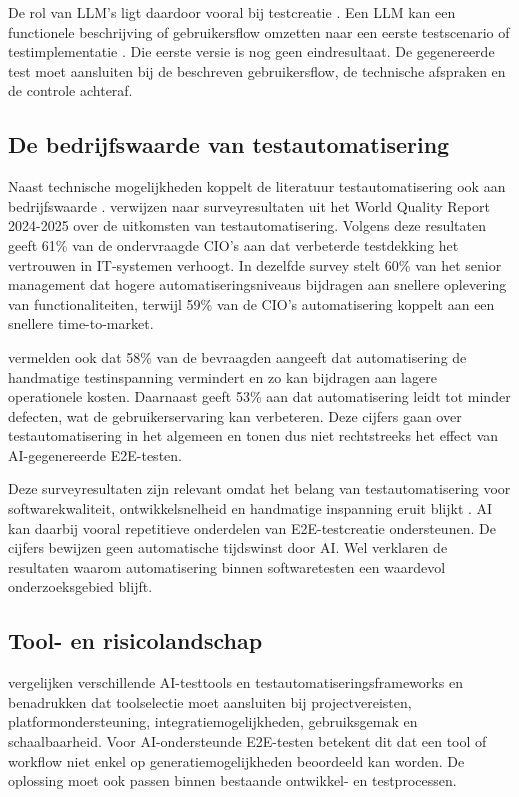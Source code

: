 De rol van LLM's ligt daardoor vooral bij testcreatie \autocite{SaezIznaga2025}. Een LLM kan een functionele beschrijving of gebruikersflow omzetten naar een eerste testscenario of testimplementatie \autocite{SaezIznaga2025}. Die eerste versie is nog geen eindresultaat. De gegenereerde test moet aansluiten bij de beschreven gebruikersflow, de technische afspraken en de controle achteraf.

\subsection{De bedrijfswaarde van testautomatisering}

Naast technische mogelijkheden koppelt de literatuur testautomatisering ook aan bedrijfswaarde \autocite{Raju2025}. \textcite{Raju2025} verwijzen naar surveyresultaten uit het World Quality Report 2024-2025 over de uitkomsten van testautomatisering. Volgens deze resultaten geeft 61\% van de ondervraagde CIO's aan dat verbeterde testdekking het vertrouwen in IT-systemen verhoogt. In dezelfde survey stelt 60\% van het senior management dat hogere automatiseringsniveaus bijdragen aan snellere oplevering van functionaliteiten, terwijl 59\% van de CIO's automatisering koppelt aan een snellere time-to-market.

\textcite{Raju2025} vermelden ook dat 58\% van de bevraagden aangeeft dat automatisering de handmatige testinspanning vermindert en zo kan bijdragen aan lagere operationele kosten. Daarnaast geeft 53\% aan dat automatisering leidt tot minder defecten, wat de gebruikerservaring kan verbeteren. Deze cijfers gaan over testautomatisering in het algemeen en tonen dus niet rechtstreeks het effect van AI-gegenereerde E2E-testen.

Deze surveyresultaten zijn relevant omdat het belang van testautomatisering voor softwarekwaliteit, ontwikkelsnelheid en handmatige inspanning eruit blijkt \autocite{Raju2025}. AI kan daarbij vooral repetitieve onderdelen van E2E-testcreatie ondersteunen. De cijfers bewijzen geen automatische tijdswinst door AI. Wel verklaren de resultaten waarom automatisering binnen softwaretesten een waardevol onderzoeksgebied blijft.

\subsection{Tool- en risicolandschap}

\textcite{Raju2025a} vergelijken verschillende AI-testtools en testautomatiseringsframeworks en benadrukken dat toolselectie moet aansluiten bij projectvereisten, platformondersteuning, integratiemogelijkheden, gebruiksgemak en schaalbaarheid. Voor AI-ondersteunde E2E-testen betekent dit dat een tool of workflow niet enkel op generatiemogelijkheden beoordeeld kan worden. De oplossing moet ook passen binnen bestaande ontwikkel- en testprocessen.

